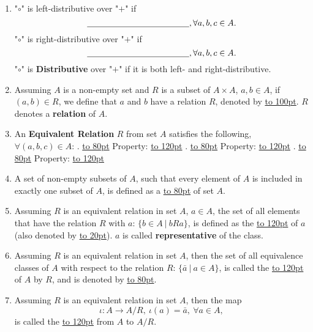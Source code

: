 \documentclass[12pt]{scrartcl}
\begin{document}
{{\begin{enumerate}[label=(\alph*)]
	\item "$\circ$" is left-distributive over "$+$" if $$\underline{\hbox to 120pt{}}, \forall a, b, c \in A.$$
	"$\circ$" is right-distributive over "$+$" if $$\underline{\hbox to 120pt{}}, \forall a, b, c \in A.$$
	"$\circ$" is \textbf{Distributive} over "$+$" if it is both left- and right-distributive. \\

	\item Assuming $A$ is a non-empty set and $R$ is a subset of $A \times A$, $a, b \in A$, if $(a, b) \in R$, we define that $a$ and $b$ have a relation $R$, denoted by \underline{\hbox to 100pt{}}. $R$ denotes a \textbf{relation} of $A$.  \\

	\item An \textbf{Equivalent Relation} $R$ from set $A$ satisfies the following, $\forall (a, b, c) \in A$:
		. \underline{\hbox to 80pt{}}  Property: \underline{\hbox to 120pt{}}		
		. \underline{\hbox to 80pt{}}  Property: \underline{\hbox to 120pt{}}
		. \underline{\hbox to 80pt{}}  Property: \underline{\hbox to 120pt{}} \\


	\item A set of non-empty subsets of $A$, such that every element of $A$ is included in exactly one subset of $A$, is defined as a \underline{\hbox to 80pt{}} of set $A$. \\
	
	\item Assuming $R$ is an equivalent relation in set $A$, $a \in A$, the set of all elements that have the relation $R$ with $a$: $\{b \in A ~ | ~ bRa\}$, is defined as the \underline{\hbox to 120pt{}} of $a$ (also denoted by \underline{\hbox to 20pt{}}). $a$ is called \textbf{representative} of the class. \\

	\item Assuming $R$ is an equivalent relation in set $A$, then the set of all equivalence classes of $A$ with respect to the relation $R$: $\{\bar{a} ~ | ~ a \in A\}$, is called the \underline{\hbox to 120pt{}} of $A$ by $R$, and is denoted by \underline{\hbox to 80pt{}}. \\

	\item Assuming $R$ is an equivalent relation in set $A$, then the map $$\iota: A \rightarrow A/R, ~\iota(a) = \bar{a}, ~\forall a \in A,$$ is called the \underline{\hbox to 120pt{}} from $A$ to $A/R$. \\


\end{enumerate}}}
\end{document}
